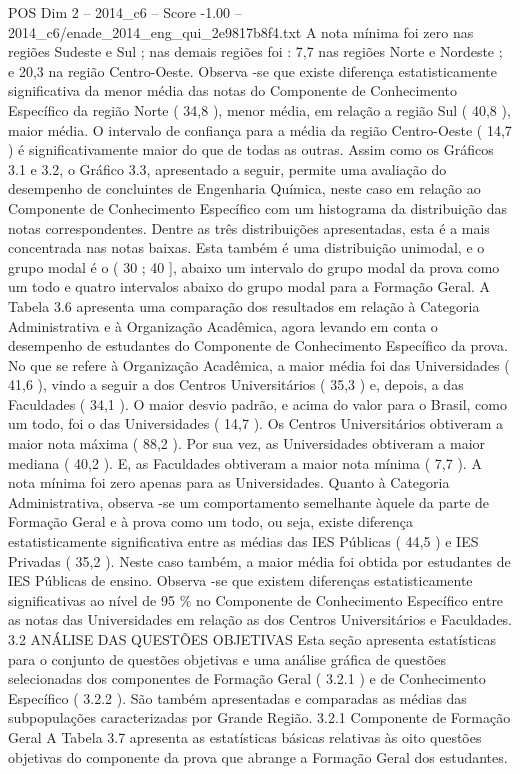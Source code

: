 \begin{textsample}{POS Dim 2 – 2014\_c6 – Score -1.00 – 2014\_c6/enade\_2014\_eng\_qui\_2e9817b8f4.txt}
A nota mínima foi zero nas regiões Sudeste e Sul ; nas demais regiões foi : 7,7 nas regiões Norte e Nordeste ; e 20,3 na região Centro-Oeste.
Observa -se que existe diferença estatisticamente significativa da menor média das notas do Componente de Conhecimento Específico da região Norte ( 34,8 ), menor média, em relação a região Sul ( 40,8 ), maior média.
O intervalo de confiança para a média da região Centro-Oeste ( 14,7 ) é significativamente maior do que de todas as outras.
Assim como os Gráficos 3.1 e 3.2, o Gráfico 3.3, apresentado a seguir, permite uma avaliação do desempenho de concluintes de Engenharia Química, neste caso em relação ao Componente de Conhecimento Específico com um histograma da distribuição das notas correspondentes.
Dentre as três distribuições apresentadas, esta é a mais concentrada nas notas baixas.
Esta também é uma distribuição unimodal, e o grupo modal é o ( 30 ; 40 ], abaixo um intervalo do grupo modal da prova como um todo e quatro intervalos abaixo do grupo modal para a Formação Geral.
A Tabela 3.6 apresenta uma comparação dos resultados em relação à Categoria Administrativa e à Organização Acadêmica, agora levando em conta o desempenho de estudantes do Componente de Conhecimento Específico da prova.
No que se refere à Organização Acadêmica, a maior média foi das Universidades ( 41,6 ), vindo a seguir a dos Centros Universitários ( 35,3 ) e, depois, a das Faculdades ( 34,1 ).
O maior desvio padrão, e acima do valor para o Brasil, como um todo, foi o das Universidades ( 14,7 ).
Os Centros Universitários obtiveram a maior nota máxima ( 88,2 ).
Por sua vez, as Universidades obtiveram a maior mediana ( 40,2 ).
E, as Faculdades obtiveram a maior nota mínima ( 7,7 ).
A nota mínima foi zero apenas para as Universidades.
Quanto à Categoria Administrativa, observa -se um comportamento semelhante àquele da parte de Formação Geral e à prova como um todo, ou seja, existe diferença estatisticamente significativa entre as médias das IES Públicas ( 44,5 ) e IES Privadas ( 35,2 ).
Neste caso também, a maior média foi obtida por estudantes de IES Públicas de ensino.
Observa -se que existem diferenças estatisticamente significativas ao nível de 95 \% no Componente de Conhecimento Específico entre as notas das Universidades em relação as dos Centros Universitários e Faculdades. 3.2 ANÁLISE DAS QUESTÕES OBJETIVAS Esta seção apresenta estatísticas para o conjunto de questões objetivas e uma análise gráfica de questões selecionadas dos componentes de Formação Geral ( 3.2.1 ) e de Conhecimento Específico ( 3.2.2 ).
São também apresentadas e comparadas as médias das subpopulações caracterizadas por Grande Região. 3.2.1 Componente de Formação Geral A Tabela 3.7 apresenta as estatísticas básicas relativas às oito questões objetivas do componente da prova que abrange a Formação Geral dos estudantes.

\end{textsample}
